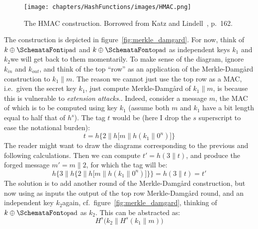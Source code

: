   \bigskip

  \begin{figure}
    \centering
    \texttt{[image: chapters/HashFunctions/images/HMAC.png]}
    \caption{The HMAC construction. Borrowed from Katz and Lindell~\cite{KatzLindell:IMC}, p.\ 162.}
    \label{fig:hmac}
  \end{figure}

   The construction is depicted in figure~\ref{fig:merkle_damgard}. For now, think of $k \oplus \myemph{ipad}$ and $k \oplus \myemph{opad}$ as independent keys $k_1$ and $k_2$\emd we will get back to them momentarily. To make sense of the diagram, ignore $k_{in}$ and $k_{out}$, and think of the top ``row'' as an application of the Merkle-Damgård construction to $k_1\|m$. The reason we cannot just use the top row as a MAC, i.e.\ given the secret key $k_1$, just compute Merkle-Damgård of $k_1\|m$, is because this is vulnerable to \emph{extension attacks}.. Indeed, consider a message $m$, the MAC of which is to be computed using key $k_1$ (assume both $m$ and $k_1$ have a bit length equal to half that of $h^s$). The tag $t$ would be (here I drop the $s$ superscript to ease the notational burden):
  \begin{equation}
    t = h\bigg\{2\|h\big[m\|h(k_1\|0^n)\big]\bigg\}
  \end{equation}
  The reader might want to draw the diagrams corresponding to the previous and following calculations. Then we can compute $t' = h(3\|t)$, and produce the forged message $m' = m\|2$, for which the tag will be:
  \begin{equation}
    h\bigg\{3\|h\Big\{2\|h\big[m\|h(k_1\|0^n)\big]\Big\}\bigg\} = h(3\|t) = t'
  \end{equation}
  The solution is to add another round of the Merkle-Damgård construction, but now using as inputs the output of the top row Merkle-Damgård round, and an independent key $k_2$\emd again, cf.\ figure~\ref{fig:merkle_damgard}, thinking of $k \oplus \myemph{opad}$ as $k_2$. This can be abstracted as:
  \begin{equation}
    H^s\big(k_2\| H^s(k_1\|m)\big)
  \end{equation}
